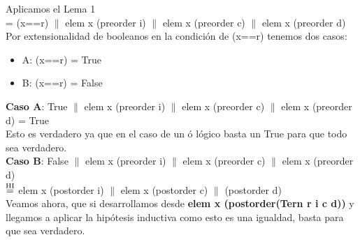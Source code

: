 \documentclass{article}
\begin{document}
Aplicamos el Lema 1 \\
= (x==r) $\|$ elem x (preorder i) $\|$ elem x (preorder c) $\|$ elem x (preorder d) \\
Por extensionalidad de booleanos en la condición de (x==r) tenemos dos casos:
\begin{itemize}
\item A: (x==r) = True 
\item B: (x==r) = False
\end{itemize}
\textbf{Caso A}: True $\|$ elem x (preorder i) $\|$ elem x (preorder c) $\|$ elem x (preorder d) = True \\
Esto es verdadero ya que en el caso de un ó lógico basta un True para que todo sea verdadero.  \\  
\textbf{Caso B}: False $\|$ elem x (preorder i) $\|$ elem x (preorder c) $\|$ elem x (preorder d) \\ 
$\stackrel{\text{HI}}{=}$ elem x (postorder i) $\|$ elem x (postorder c) $\|$ (postorder d) \\

Veamos ahora, que si desarrollamos desde \textbf{elem x (postorder(Tern r i c d))} y llegamos a aplicar la hipótesis inductiva como esto es una igualdad, basta para que sea verdadero. \\
\end{document}
